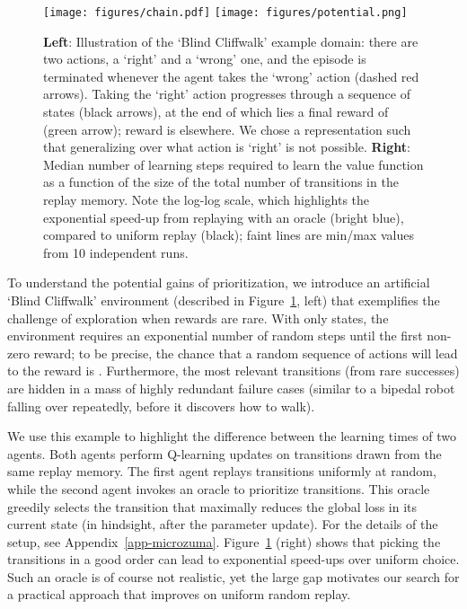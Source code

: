 \documentclass[a4paper]{article}
\begin{document}
\begin{figure}[tb]
\vspace{-1em}
\centerline{
\texttt{[image: figures/chain.pdf]}
\hspace{0.1\textwidth}
\texttt{[image: figures/potential.png]}
}
\vspace{-0.5em}
\caption{
\label{fig-microzuma-chain}
{\bf Left}: Illustration of the `Blind Cliffwalk' example domain: there are two actions, a `right' and a `wrong' one, 
and the episode is terminated whenever the agent takes the `wrong' action (dashed red arrows). 
Taking the `right' action progresses through a sequence of  states (black arrows), at the end of which lies
a final reward of  (green arrow); reward is  elsewhere. We chose a representation such that generalizing over what action is `right' is not possible.
{\bf Right}: Median number of learning steps required to learn the value function as a function of the size of the total number of transitions in the replay memory. 
Note the log-log scale, which highlights the exponential speed-up from replaying with an oracle (bright blue), compared to uniform replay (black); faint lines are min/max values from 10 independent runs.
\vspace{-1em}
}
\end{figure}

To understand the potential gains of prioritization, we introduce an artificial `Blind Cliffwalk' environment (described in Figure~\ref{fig-microzuma-chain}, left)
that exemplifies the challenge of exploration when rewards
are rare.
With only  states, the environment requires an exponential number of random steps until the first non-zero reward; 
to be precise, the chance that a random sequence of actions will lead to the reward is .
Furthermore, the most relevant transitions (from rare successes) 
are hidden in a mass of highly redundant failure cases (similar to a bipedal robot falling over repeatedly, before it discovers how to walk).

We use this example to highlight the difference between the learning times of two agents. Both agents perform Q-learning updates on transitions drawn from the same replay memory. The first agent replays transitions uniformly at random, while the second agent invokes an oracle to prioritize transitions. This oracle greedily selects the transition that maximally reduces the global loss in its current state (in hindsight, after the parameter update).
For the details of the setup, see Appendix~\ref{app-microzuma}.
Figure~\ref{fig-microzuma-chain} (right) shows that picking the transitions in a good order
can lead to exponential speed-ups over uniform choice.
Such an oracle is of course not realistic, yet the large gap motivates our search 
for a practical approach that improves on uniform random replay. 
\end{document}
